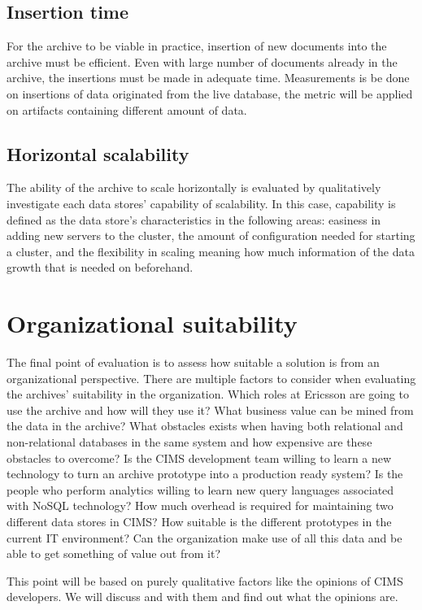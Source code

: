 \subsection{Insertion time}
For the archive to be viable in practice, insertion of new documents into the archive must be efficient. Even with large number of documents already in the archive, the insertions must be made in adequate time. Measurements is be done on insertions of data originated from the live database, the metric will be applied on artifacts containing different amount of data.

\subsection{Horizontal scalability}
The ability of the archive to scale horizontally is evaluated by qualitatively investigate each data stores' capability of scalability. In this case, capability is defined as the data store's characteristics in the following areas: easiness in adding new servers to the cluster, the amount of configuration needed for starting a cluster, and the flexibility in scaling meaning how much information of the data growth that is needed on beforehand.   

\section{Organizational suitability}
The final point of evaluation is to assess how suitable a solution is from an organizational perspective. There are multiple factors to consider when evaluating the archives' suitability in the organization. Which roles at Ericsson are going to use the archive and how will they use it? What business value can be mined from the data in the archive? What obstacles exists when having both relational and non-relational databases in the same system and how expensive are these obstacles to overcome? Is the CIMS development team willing to learn a new technology to turn an archive prototype into a production ready system? Is the people who perform analytics willing to learn new query languages associated with NoSQL technology? How much overhead is required for maintaining two different data stores in CIMS? How suitable is the different prototypes in the current IT environment? Can the organization make use of all this data and be able to get something of value out from it?    

This point will be based on purely qualitative factors like the opinions of CIMS developers. We will discuss and with them and find out what the opinions are.